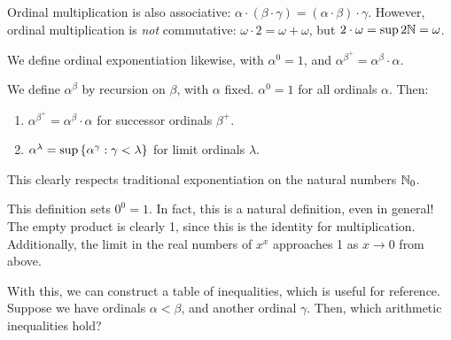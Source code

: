 \documentclass{article}
\begin{document}
\begin{corollary}
	Ordinal multiplication is also associative: $\alpha \cdot (\beta \cdot \gamma) = (\alpha \cdot \beta) \cdot \gamma$. However, ordinal multiplication is \textit{not} commutative: $\omega \cdot 2 = \omega + \omega$, but $2 \cdot \omega = \sup 2\mathbb{N} = \omega$.
\end{corollary}

We define ordinal exponentiation likewise, with $\alpha^0 = 1$, and $\alpha^{\beta^+} = \alpha^\beta \cdot \alpha$.

\begin{definition}
    We define $\alpha^\beta$ by recursion on $\beta$, with $\alpha$ fixed. $\alpha^0 = 1$ for all ordinals $\alpha$. Then:
    \begin{enumerate}
    	\item $\alpha^{\beta^+} = \alpha^\beta \cdot \alpha$ for successor ordinals $\beta^+$.
    	\item $\alpha^\lambda = \sup \left\lbrace \alpha^\gamma : \gamma < \lambda \right\rbrace$ for limit ordinals $\lambda$.
	\end{enumerate}
	This clearly respects traditional exponentiation on the natural numbers $\mathbb{N}_0$.
\end{definition}

\begin{note}
	This definition sets $0^0 = 1$. In fact, this is a natural definition, even in general! The empty product is clearly 1, since this is the identity for multiplication. Additionally, the limit in the real numbers of $x^x$ approaches 1 as $x \to 0$ from above.
\end{note}

With this, we can construct a table of inequalities, which is useful for reference. Suppose we have ordinals $\alpha < \beta$, and another ordinal $\gamma$. Then, which arithmetic inequalities hold?

\renewcommand{\arraystretch}{1.6}
\end{document}
